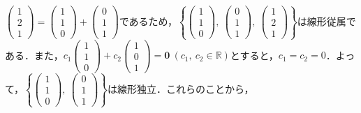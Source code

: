 \begin{ans}
$\begin{pmatrix}1 \\ 2 \\ 1\end{pmatrix}=\begin{pmatrix}1 \\ 1 \\ 0\end{pmatrix}+\begin{pmatrix}0 \\ 1 \\ 1\end{pmatrix}$であるため，$\left\{\begin{pmatrix}1 \\ 1 \\ 0\end{pmatrix},\ \begin{pmatrix}0 \\ 1 \\ 1\end{pmatrix},\ \begin{pmatrix}1 \\ 2 \\ 1\end{pmatrix}\right\}$は線形従属である．また，$c_1\begin{pmatrix}1 \\ 1 \\ 0\end{pmatrix}+c_2\begin{pmatrix}1 \\ 0 \\ 1\end{pmatrix}=\bm{0}\ (c_1,\ c_2\in\mathbb{R})$とすると，$c_1=c_2=0$．よって，$\left\{\begin{pmatrix}1 \\ 1 \\ 0\end{pmatrix},\ \begin{pmatrix}0 \\ 1 \\ 1\end{pmatrix}\right\}$は線形独立．これらのことから，
\begin{align*}

\end{align*}
\end{ans}
